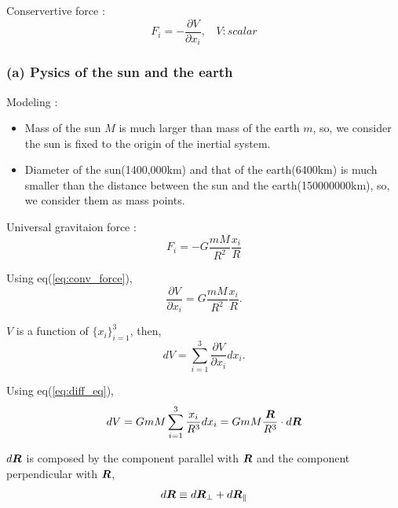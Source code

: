 \documentclass{jarticle}
\newcommand*{\mbold}[1]{\mbox{\boldmath $#1$}}
\begin{document}
\section{}
\subsection{}
\subsection{}
Conservertive force : 
\begin{equation}\label{eq:conv_force}
	F_i = -\frac{\partial V}{\partial x_i}, ~~~~ V : scalar
\end{equation}

\subsubsection*{(a) Pysics of the sun and the earth}

Modeling :
\begin{itemize}
\item Mass of the sun $M$ is much larger than mass of the earth $m$, so,  we consider the sun is fixed to the origin of the inertial system. 
\item Diameter of the sun(1400,000km) and that of the earth(6400km) is much smaller than the distance between the sun and the earth(150000000km), so, we consider them as mass points.
\end{itemize}

Universal gravitaion force : 
\begin{equation}
	F_i = -G\frac{mM}{R^2}\frac{x_i}{R}
\end{equation}

Using eq(\ref{eq:conv_force}), 
\begin{equation}\label{eq:diff_eq}
	\frac{\partial V}{\partial x_i} = G\frac{mM}{R^2}\frac{x_i}{R} .
\end{equation}

$V$ is a function of $\{x_i\}_{i=1}^3$, then,
\[
	dV = \sum_{i=1}^3 \frac{\partial V}{\partial x_i} dx_i .
\]

Using eq(\ref{eq:diff_eq}), 
\[
	dV = GmM \sum_{i=1}^3 \frac{x_i}{R^3} dx_i = GmM \frac{\mbold{R}}{R^3}\cdot d\mbold{R}
\]

$d\mbold{R}$ is composed by the component parallel with $\mbold{R}$ and the component perpendicular with $\mbold{R}$, 
\[
	d\mbold{R} \equiv d\mbold{R}_\perp +d \mbold{R}_\parallel
\]
\end{document}
